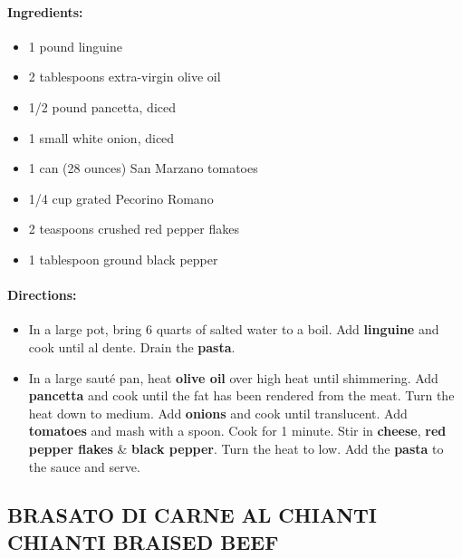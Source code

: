 \documentclass{article}
\begin{document}
\paragraph{Ingredients:}
\begin{itemize}
    \item 1 pound linguine
    \item 2 tablespoons extra-virgin olive oil
    \item 1/2 pound pancetta, diced
    \item 1 small white onion, diced
    \item 1 can (28 ounces) San Marzano tomatoes
    \item 1/4 cup grated Pecorino Romano
    \item 2 teaspoons crushed red pepper flakes
    \item 1 tablespoon ground black pepper
\end{itemize}

\paragraph{Directions:}
\begin{itemize}
    \item In a large pot, bring 6 quarts of salted water to a boil. Add \textbf{linguine} and cook until al dente. Drain the \textbf{pasta}.
    \item In a large sauté pan, heat \textbf{olive oil} over high heat until shimmering. Add \textbf{pancetta} and cook until the fat has been rendered from the meat. Turn the heat down to medium. Add \textbf{onions} and cook until translucent. Add \textbf{tomatoes} and mash with a spoon. Cook for 1 minute. Stir in \textbf{cheese}, \textbf{red pepper flakes} \& \textbf{black pepper}. Turn the heat to low. Add the \textbf{pasta} to the sauce and serve.
\end{itemize}

\subsection{BRASATO DI CARNE AL CHIANTI CHIANTI BRAISED BEEF}
\end{document}
